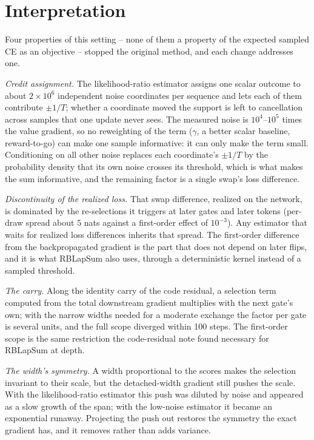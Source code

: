 \documentclass[11pt,a4paper]{article}
\begin{document}
\section{Interpretation}

Four properties of this setting -- none of them a property of the expected
sampled CE as an objective -- stopped the original method, and each change
addresses one.

\emph{Credit assignment.} The likelihood-ratio estimator assigns one scalar
outcome to about $2 \times 10^6$ independent noise coordinates per sequence and
lets each of them contribute $\pm 1/T$; whether a coordinate moved the support is
left to cancellation across samples that one update never sees. The measured
noise is $10^4$--$10^5$ times the value gradient, so no reweighting of the term
($\gamma$, a better scalar baseline, reward-to-go) can make one sample
informative: it can only make the term small. Conditioning on all other noise
replaces each coordinate's $\pm 1/T$ by the probability density that its own
noise crosses its threshold, which is what makes the sum informative, and the
remaining factor is a single swap's loss difference.

\emph{Discontinuity of the realized loss.} That swap difference, realized on the
network, is dominated by the re-selections it triggers at later gates and later
tokens (per-draw spread about $5$ nats against a first-order effect of $10^{-3}$).
Any estimator that waits for realized loss differences inherits that spread.
The first-order difference from the backpropagated gradient is the part that
does not depend on later flips, and it is what RBLapSum also uses, through a
deterministic kernel instead of a sampled threshold.

\emph{The carry.} Along the identity carry of the code residual, a selection
term computed from the total downstream gradient multiplies with the next gate's
own; with the narrow widths needed for a moderate exchange the factor per gate
is several units, and the full scope diverged within 100 steps. The first-order
scope is the same restriction the code-residual note found necessary for
RBLapSum at depth.

\emph{The width's symmetry.} A width proportional to the scores makes the
selection invariant to their scale, but the detached-width gradient still
pushes the scale. With the likelihood-ratio estimator this push was diluted by
noise and appeared as a slow growth of the span; with the low-noise estimator
it became an exponential runaway. Projecting the push out restores the
symmetry the exact gradient has, and it removes rather than adds variance.
\end{document}
